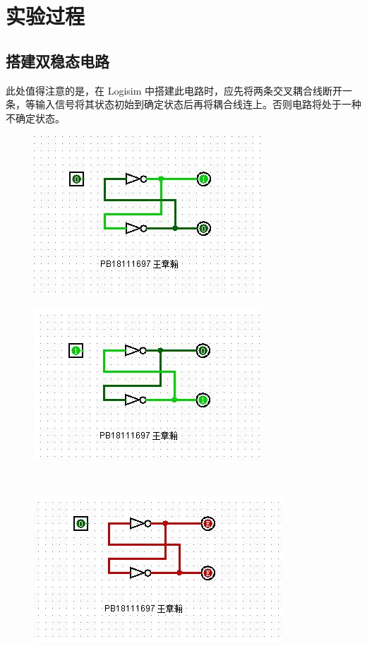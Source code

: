 \documentclass[UTF8]{article}
\begin{document}
	\section{实验过程}
	\subsection{搭建双稳态电路}
	此处值得注意的是，在 Logisim 中搭建此电路时，应先将两条交叉耦合线断开一条，等输入信号将其状态初始到确定状态后再将耦合线连上。否则电路将处于一种不确定状态。\par
	\begin{figure}[H]
		\begin{minipage}[H]{0.45\linewidth}
			\centering
			\includegraphics[scale=0.7]{1_1.jpg}
			\label{1_1}
		\end{minipage}
		\begin{minipage}[H]{0.45\linewidth}
			\centering
			\includegraphics[scale=0.7]{1_2.jpg}
			\label{1_2}
		\end{minipage}\\
		\begin{center}
			\begin{minipage}[H]{0.5\linewidth}
				\centering
				\includegraphics[scale=0.7]{1_3.jpg}
				\label{1_3}
			\end{minipage}
		\end{center}
	\end{figure}
\end{document}
